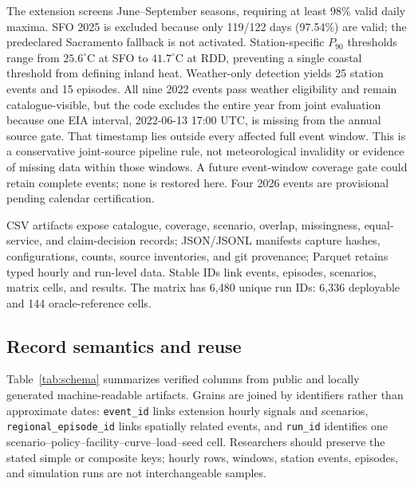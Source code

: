 \documentclass[pdflatex,sn-mathphys-num]{sn-jnl}
\begin{document}
The extension screens June--September seasons, requiring at least 98\% valid daily maxima. SFO 2025 is excluded because only 119/122 days (97.54\%) are valid; the predeclared Sacramento fallback is not activated. Station-specific $P_{90}$ thresholds range from $25.6^{\circ}$C at SFO to $41.7^{\circ}$C at RDD, preventing a single coastal threshold from defining inland heat. Weather-only detection yields 25 station events and 15 episodes. All nine 2022 events pass weather eligibility and remain catalogue-visible, but the code excludes the entire year from joint evaluation because one EIA interval, 2022-06-13 17:00 UTC, is missing from the annual source gate. That timestamp lies outside every affected full event window. This is a conservative joint-source pipeline rule, not meteorological invalidity or evidence of missing data within those windows. A future event-window coverage gate could retain complete events; none is restored here. Four 2026 events are provisional pending calendar certification.

CSV artifacts expose catalogue, coverage, scenario, overlap, missingness, equal-service, and claim-decision records; JSON/JSONL manifests capture hashes, configurations, counts, source inventories, and git provenance; Parquet retains typed hourly and run-level data. Stable IDs link events, episodes, scenarios, matrix cells, and results. The matrix has 6,480 unique run IDs: 6,336 deployable and 144 oracle-reference cells.

\subsection{Record semantics and reuse}

Table~\ref{tab:schema} summarizes verified columns from public and locally generated machine-readable artifacts. Grains are joined by identifiers rather than approximate dates: \texttt{event\_id} links extension hourly signals and scenarios, \texttt{regional\_episode\_id} links spatially related events, and \texttt{run\_id} identifies one scenario--policy--facility--curve--load--seed cell. Researchers should preserve the stated simple or composite keys; hourly rows, windows, station events, episodes, and simulation runs are not interchangeable samples.
\end{document}
